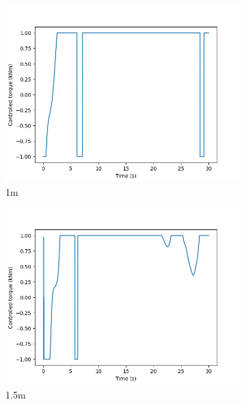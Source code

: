 \documentclass[class=article, crop=false]{standalone}
\begin{document}
\begin{figure}
    \vfill
    \begin{subfigure}[b]{0.48\textwidth}
        \centering
        \includegraphics{scenario1/rov-0m/1.0m/usv_torque}
        \caption{1m}
        \label{}
    \end{subfigure}
    \hfill
    \begin{subfigure}[b]{0.48\textwidth}
        \centering
        \includegraphics{scenario1/rov-0m/1.5m/usv_torque}
        \caption{1.5m}
        \label{}
    \end{subfigure}
    \vfill
    \begin{subfigure}[b]{0.48\textwidth}
        \centering

\end{subfigure}
\end{figure}
\end{document}
